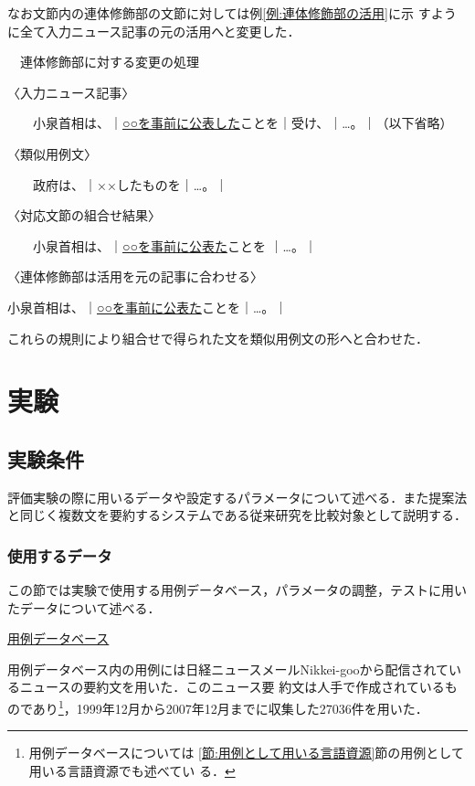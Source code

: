\documentclass[japanese]{jnlp_1.4}
\newcounter{exp}
\def\exp#1{}
\def\toolref#1{}
\begin{document}
なお文節内の連体修飾部の文節に対しては例\ref{例:連体修飾部の活用}に示
すように全て入力ニュース記事の元の活用へと変更した．
\begin{screen}
\exp{例:連体修飾部の活用}　連体修飾部に対する変更の処理

〈入力ニュース記事〉

　　小泉首相は、｜\ul{○○を事前に公表した}\footnotemark ことを｜受け、｜…。｜（以下省略）

〈類似用例文〉

　　政府は、｜××したものを｜…。｜

〈対応文節の組合せ結果〉

　　小泉首相は、｜\ul{○○を事前に公表}\setnami{}\ul{た}ことを
｜…。｜

〈連体修飾部は活用を元の記事に合わせる〉

小泉首相は、｜\ul{○○を事前に公表}\setnami{}\ul{た}ことを｜…。｜
\end{screen}


これらの規則により組合せで得られた文を類似用例文の形へと合わせた．




\section{実験}\label{章:評価実験及び考察}

\subsection{実験条件}

評価実験の際に用いるデータや設定するパラメータについて述べる．また提案法
と同じく複数文を要約するシステムである従来研究を比較対象として説明する．


\subsubsection{使用するデータ}\label{節:使用するデータ}

この節では実験で使用する用例データベース，パラメータの調整，テストに用い
たデータについて述べる．

\noindent \ul{用例データベース}

用例データベース内の用例には日経ニュースメールNikkei-goo\toolref{言語資
源:nikkei-goo}から配信されているニュースの要約文を用いた．このニュース要
約文は人手で作成されているものであり\footnote{用例データベースについては
\ref{節:用例として用いる言語資源}節の用例として用いる言語資源でも述べてい
る．}，1999年12月から2007年12月までに収集した27036件を用いた．
\end{document}
